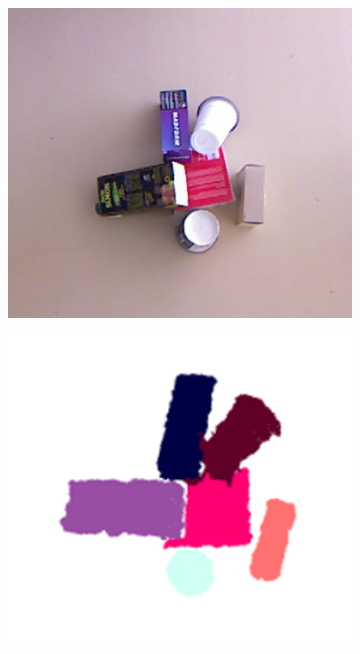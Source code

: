 \begin{figure}[h]
\centering
\begin{subfigure}[t]{0.2\textwidth}
\centering
\includegraphics[width=\textwidth]{Img/ObjectSegmentation/seg1_rgb.png}
\end{subfigure}
\begin{subfigure}[t]{0.2\textwidth}
\centering
\includegraphics[width=\textwidth]{Img/ObjectSegmentation/seg1.png}

\end{subfigure}
\end{figure}
